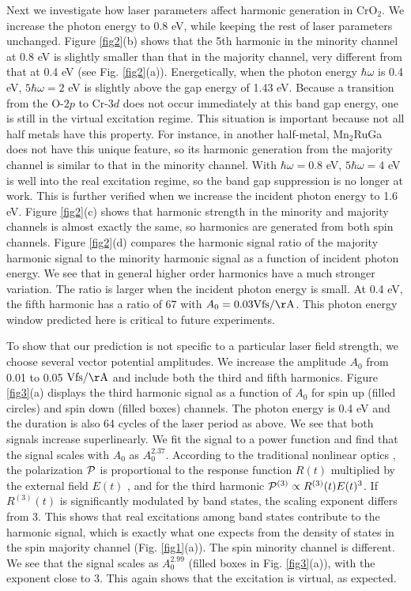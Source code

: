 \documentclass[checkin,showpacs,psfig,aps,pra]{revtex4}
\begin{document}
Next we investigate how laser parameters affect harmonic generation in
CrO$_2$. We increase the photon energy to 0.8 eV, while keeping the
rest of laser parameters unchanged. Figure \ref{fig2}(b) shows that
the 5th harmonic in the minority channel at 0.8 eV is slightly smaller
than that in the majority channel, very different from that at 0.4 eV
(see Fig. \ref{fig2}(a)). Energetically, when the photon energy
$\hbar\omega$ is 0.4 eV, $5\hbar\omega=2$ eV is slightly above the gap
energy of 1.43 eV. Because a transition from the O-$2p$ to Cr-$3d$
does not occur immediately at this band gap energy, one is still in
the virtual excitation regime. This situation is important because not
all half metals have this property. For instance, in another
half-metal, Mn$_2$RuGa does not have this unique feature, so its
harmonic generation from the majority channel is similar to that in
the minority channel. With $\hbar\omega= 0.8$ eV, $5\hbar\omega=4$ eV
is well into the real excitation regime, so the band gap suppression
is no longer at work. This is further verified when we increase the
incident photon energy to 1.6 eV. Figure \ref{fig2}(c) shows that
harmonic strength in the minority and majority channels is almost
exactly the same, so harmonics are generated from both spin
channels. Figure \ref{fig2}(d) compares the harmonic signal ratio of
the majority harmonic signal to the minority harmonic signal as a
function of incident photon energy. We see that in general higher
order harmonics have a much stronger variation. The ratio is larger
when the incident photon energy is small. At 0.4 eV, the fifth
harmonic has a ratio of 67 with $A_0=\rm 0.03Vfs/\AA$.  This photon
energy window predicted here is critical to future experiments.


To show that our prediction is not specific to a particular laser
field strength, we choose several vector potential amplitudes. We
increase the amplitude $A_0$ from 0.01 to 0.05 $\rm Vfs/\AA$ and
include both the third and fifth harmonics. Figure \ref{fig3}(a)
displays the third harmonic signal as a function of $A_0$ for spin up
(filled circles) and spin down (filled boxes) channels.  The photon
energy is 0.4 eV and the duration is also 64 cycles of the laser
period as above. We see that both signals increase superlinearly. We
fit the signal to a power function and find that the signal scales
with $A_0$ as $A_0^{2.37}$.  According to the traditional nonlinear
optics \cite{shen}, the polarization ${\cal P}$ is proportional to the
response function $R(t)$ multiplied by the external field $E(t)$
\cite{mukamel}, and for the third harmonic ${\cal P}^{(3)}\propto
R^{(3)}(t) E(t)^3$. If $R^{(3)}(t)$ is significantly modulated by band
states, the scaling exponent differs from 3. This shows that real
excitations among band states contribute to the harmonic signal, which
is exactly what one expects from the density of states in the spin
majority channel (Fig. \ref{fig1}(a)). The spin minority channel is
different. We see that the signal scales as $A_0^{2.99}$ (filled boxes
in Fig. \ref{fig3}(a)), with the exponent close to 3. This again shows
that the excitation is virtual, as expected. 
\end{document}
